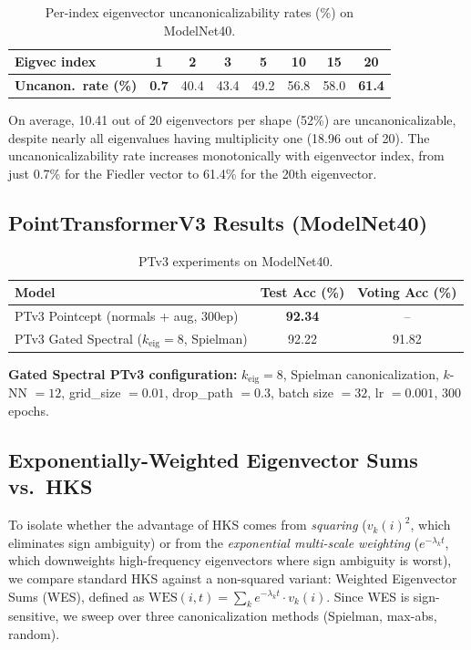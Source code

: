 \documentclass[11pt]{article}
\begin{document}
\begin{table}[ht]
\centering
\caption{Per-index eigenvector uncanonicalizability rates (\%) on ModelNet40.}
\label{tab:uncanon_rates}
\begin{tabular}{lccccccc}
\toprule
\textbf{Eigvec index} & 1 & 2 & 3 & 5 & 10 & 15 & 20 \\
\midrule
\textbf{Uncanon.\ rate (\%)} & \textbf{0.7} & 40.4 & 43.4 & 49.2 & 56.8 & 58.0 & \textbf{61.4} \\
\bottomrule
\end{tabular}
\end{table}

On average, 10.41 out of 20 eigenvectors per shape (52\%) are uncanonicalizable, despite
nearly all eigenvalues having multiplicity one (18.96 out of 20). The uncanonicalizability
rate increases monotonically with eigenvector index, from just 0.7\% for the Fiedler vector
to 61.4\% for the 20th eigenvector.

\subsection{PointTransformerV3 Results (ModelNet40)}

\begin{table}[ht]
\centering
\caption{PTv3 experiments on ModelNet40.}
\label{tab:ptv3}
\begin{tabular}{lcc}
\toprule
\textbf{Model} & \textbf{Test Acc (\%)} & \textbf{Voting Acc (\%)} \\
\midrule
PTv3 Pointcept (normals + aug, 300ep) & \textbf{92.34} & -- \\
PTv3 Gated Spectral ($k_{\text{eig}}{=}8$, Spielman) & 92.22 & 91.82 \\
\bottomrule
\end{tabular}
\end{table}

\noindent\textbf{Gated Spectral PTv3 configuration:}
$k_{\text{eig}} = 8$, Spielman canonicalization, $k$-NN $= 12$, grid\_size $= 0.01$,
drop\_path $= 0.3$, batch size $= 32$, lr $= 0.001$, 300 epochs.

\subsection{Exponentially-Weighted Eigenvector Sums vs.\ HKS}

To isolate whether the advantage of HKS comes from \emph{squaring} ($v_k(i)^2$, which
eliminates sign ambiguity) or from the \emph{exponential multi-scale weighting}
($e^{-\lambda_k t}$, which downweights high-frequency eigenvectors where sign ambiguity is
worst), we compare standard HKS against a non-squared variant: Weighted Eigenvector Sums
(WES), defined as $\text{WES}(i,t) = \sum_k e^{-\lambda_k t} \cdot v_k(i)$. Since WES is
sign-sensitive, we sweep over three canonicalization methods (Spielman, max-abs, random).
\end{document}
